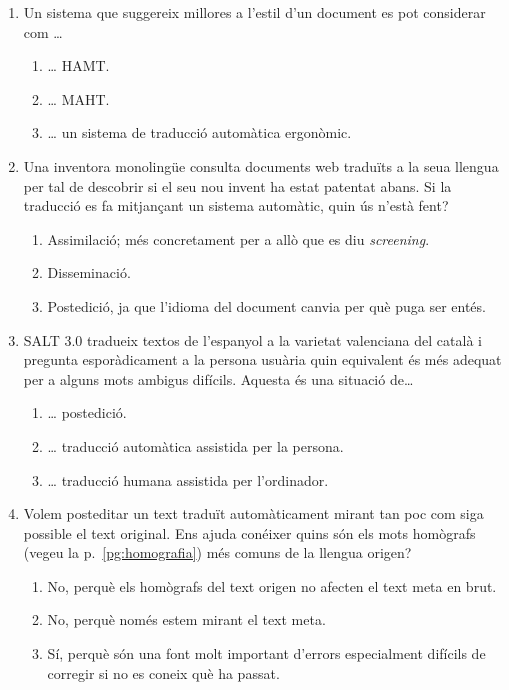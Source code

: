 \begin{enumerate}
\item 
Un sistema que suggereix millores a l'estil d'un document es pot
considerar com {\ldots}

\begin{enumerate}
\item {\ldots} HAMT.
\item {\ldots} MAHT.
\item {\ldots} un sistema de traducció automàtica ergonòmic.
\end{enumerate}

\item 
Una inventora monolingüe consulta documents web traduïts a
la seua llengua per tal de descobrir si el seu nou invent ha estat
patentat abans. Si la traducció es fa mitjançant un sistema automàtic,
quin ús n'està fent?

\begin{enumerate}
\item Assimilació; més concretament per a allò que 
          es diu \emph{screening}.
\item Disseminació.
\item Postedició, ja que l'idioma del document canvia per què puga
ser entés.
\end{enumerate}

\item SALT 3.0 tradueix textos de l'espanyol a la varietat valenciana
  del català i pregunta esporàdicament a la persona usuària quin
  equivalent és més adequat per a alguns mots ambigus difícils.
  Aquesta és una situació de{\ldots}
   
\begin{enumerate}
\item {\ldots} postedició.
\item {\ldots} traducció automàtica assistida per la persona.
\item {\ldots} traducció humana assistida per l'ordinador.
\end{enumerate}

\item Volem posteditar un text traduït automàticament mirant tan
   poc com siga possible el text original. Ens ajuda conéixer quins
   són els mots homògrafs (vegeu la p.~\ref{pg:homografia}) més comuns de la llengua origen?
   
\begin{enumerate}
\item No, perquè els homògrafs del text origen no afecten el text meta en brut.
\item No, perquè només estem mirant el text meta.
\item Sí, perquè són una font molt important d'errors
      especialment difícils
      de corregir si no es coneix què ha passat.
\end{enumerate}


\end{enumerate}
